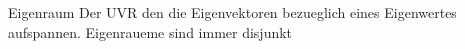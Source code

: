 \documentclass[class=article, crop=false]{standalone}
\begin{document}
\begin{zettel}{Eigenraum}
    Der UVR den die Eigenvektoren bezueglich eines Eigenwertes aufspannen. Eigenraueme sind immer disjunkt
\end{zettel}
\end{document}

